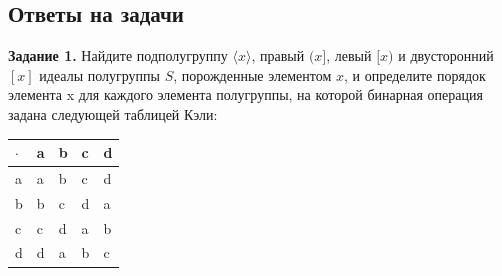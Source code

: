 \documentclass[spec, och, labwork]{shiza}
\begin{document}
    \subsection{Ответы на задачи}
      \textbf{Задание 1.} Найдите подполугруппу $\langle x \rangle$, правый $(x]$, левый $[x)$ и двусторонний $[x]$ идеалы
      полугруппы $S$, порожденные элементом $x$, и определите порядок элемента x для каждого элемента полугруппы, на
      которой бинарная операция задана следующей таблицей Кэли:
        \begin{table}[H]
            \centering
            \begin{tabular}{|l|l|l|l|l|}
            \hline
            $\cdot$ & a & b & c & d \\ \hline
            a & a & b & c & d \\ \hline
            b & b & c & d & a \\ \hline
            c & c & d & a & b \\ \hline
            d & d & a & b & c \\ \hline
        \end{tabular}
        \end{table}
\end{document}
